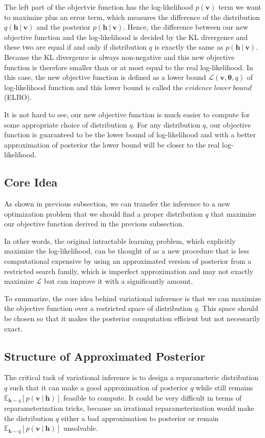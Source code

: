 \documentclass[conference]{IEEEtran}
\begin{document}
The left part of the objectvie function has the log-likelihood $p(\boldsymbol{v})$ term we want to maximize plus an error term, which measures the difference of the distribution $q(\boldsymbol{h}\ |\ \boldsymbol{v})$ and the posterior $p(\boldsymbol{h}\ |\ \boldsymbol{v})$. Hence, the difference between our new objective function and the log-likelihood is decided by the KL divergence and these two are equal if and only if distribution $q$ is exactly the same as $p(\boldsymbol{h}\ |\ \boldsymbol{v})$. Because the KL divergence is always non-negative and this new objective function is therefore smaller than or at most equal to the real log-likelihood. In this case, the new objective function is defined as a lower bound $\mathcal{L}(\boldsymbol{v}, \boldsymbol{\theta}, q)$ of log-likelihood function and this lower bound is called the $evidence\ lower\ bound$ (ELBO).

It is not hard to see, our new objective function is much easier to compute for some appropriate choice of distribution $q$. For any distribution $q$, our objective function is guaranteed to be the lower bound of log-likelihood and with a better approximation of posterior the lower bound will be closer to the real log-likelihood.
\subsection{Core Idea}
As shown in previous subsection, we can transfer the inference to a new optimization problem that we should find a proper distribution $q$ that maximize our objective function derived in the previous subsection. 

In other words, the original intractable learning problem, which explicitly maximize the log-likelihood, can be thought of as a new procedure that is less computational expensive by using an approximated version of posterior from a restricted search family, which is imperfect approximation and may not exactly maximize $\mathcal{L}$ but can improve it with a significantly amount.

To summarize, the core idea behind variational inference is that we can maximize the objective function over a restricted space of distribution $q$. This space should be chosen so that it makes the posterior computation efficient but not necessarily exact.
\subsection{Structure of Approximated Posterior}
The critical task of variational inference is to design a reparameteric distribution $q$ such that it can make a good approximation of posterior $q$ while still remains $\mathbb{E}_{\boldsymbol{h}\sim q}[p(\boldsymbol{v}\ |\ \boldsymbol{h})]$ feasible to compute. It could be very difficult in terms of reparameterization tricks, because an irrational reparameterization would make the distribution $q$ either a bad approximation to posterior or remain $\mathbb{E}_{\boldsymbol{h}\sim q}[p(\boldsymbol{v}\ |\ \boldsymbol{h})]$ unsolvable.
\end{document}
